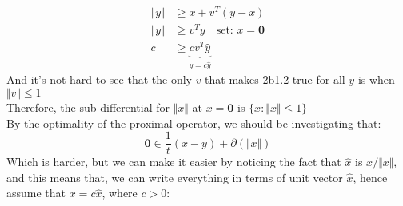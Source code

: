 \documentclass[]{article}
\begin{document}
        \begin{align*}\tag{2b1.2}\label{eqn:2b1.2}
            \Vert y\Vert &\ge x + v^T(y - x)
            \\
            \Vert y\Vert &\ge v^T y \quad \text{set: } x = \mathbf{0}
            \\
            c &\ge \underbrace{cv^T \widehat{y}}_{y = c \widehat{y}}
        \end{align*}
        And it's not hard to see that the only $v$ that makes \hyperref[eqn:2b1.2]{2b1.2} true for all $y$ is when $\Vert v\Vert \leq 1$
        \\
        Therefore, the sub-differential for $\Vert x\Vert$ at $x = \mathbf{0}$ is $\lbrace x: \Vert x\Vert\le 1\rbrace$
        \\
        By the optimality of the proximal operator, we should be investigating that: 
        $$
            \mathbf{0} \in \frac{1}{t}(x - y)  + \partial(\Vert x\Vert)
        $$
        Which is harder, but we can make it easier by noticing the fact that 
        $\widehat{x}$ is $x/\Vert x\Vert$, and this means that, we can write everything in terms of unit vector $\widehat{x}$, hence assume that $x = c \widehat{x}$, where $c > 0$:
\end{document}
